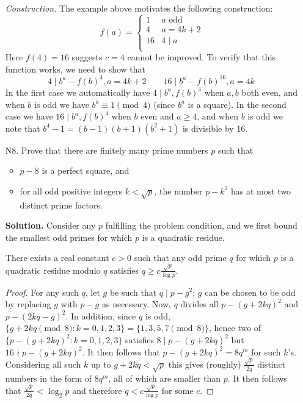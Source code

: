 \documentclass[11pt,a4paper]{article}
\begin{document}
\begin{enumerate}
    	\textit{Construction.} The example above motivates the following construction: 
    	\[
    	f(a)=
    	\begin{cases}
    		1 & a\text{ odd}\\
    		4 & a=4k+2\\
    		16 & 4\mid a\\
    	\end{cases}
    	\]
    	Here $f(4)=16$ suggests $c = 4$ cannot be improved. To verify that this function works, we need to show that 
    	\[
    	4\mid b^a-f(b)^{4}, a = 4k+2
    	\qquad 
    	16\mid b^a - f(b)^{16}, a = 4k
    	\
    	\]
    	In the first case we automatically have $4\mid b^a, f(b)^4$ when $a, b$ both even, 
    	and when $b$ is odd we have $b^a\equiv 1\pmod{4}$ (since $b^a$ is a square). 
    	In the second case we have $16\mid b^a, f(b)^4$ when $b$ even and $a\ge 4$, 
    	and when $b$ is odd we note that $b^4-1=(b-1)(b+1)(b^2+1)$ is divisible by 16. 
    	
    	\item [N8.]
    	Prove that there are finitely many prime numbers $p$ such that
    	
    	\begin{itemize}
    		\item $p-8$ is a perfect square, and
    		
    		\item for all odd positive integers $k<\sqrt{p}$, the number $p-k^2$ has at most two distinct prime factors.
    	\end{itemize}
    	
    	\textbf{Solution.}
    	Consider any $p$ fulfilling the problem condition, and we first bound the smallest odd primes for which $p$ is a quadratic residue. 
    	
    	\begin{lemma}
    		There exists a real constant $c > 0$ such that any odd prime $q$ for which $p$ is a quadratic residue modulo $q$ satisfies $q \ge c \frac{\sqrt{p}}{\log p}$. 
    	\end{lemma}
        
        \begin{proof}
        	For any such $q$, let $g$ be such that $q\mid p-g^2$; $g$ can be chosen to be odd by replacing $g$ with $p-g$ as necessary. 
        	Now, $q$ divides all $p - (g + 2kq)^2$ and $p - (2kq - g)^2$. 
        	In addition, since $q$ is odd, $\{g + 2kq\pmod 8: k=0, 1, 2, 3\}=\{1, 3, 5, 7\pmod{8}\}$, 
        	hence two of $\{p - (g+2kq)^2: k=0, 1, 2, 3\}$ satisfies $8\mid p - (g+2kq)^2$ but $16\nmid p - (g+2kq)^2$. 
        	It then follows that $p - (g+2kq)^2 = 8q^m$ for such $k$'s. 
        	Considering all such $k$ up to $g+2kq < \sqrt{p}$ this gives (roughly) $\frac{\sqrt{p}}{2q}$ distinct numbers in the form of $8q^m$, all of which are smaller than $p$. 
        	It then follows that $\frac{\sqrt{p}}{2q} < \log_2 p$ and therefore $q < c \frac{\sqrt{p}}{\log p}$ for some $c$. 
        \end{proof}
        

\end{enumerate}
\end{document}
